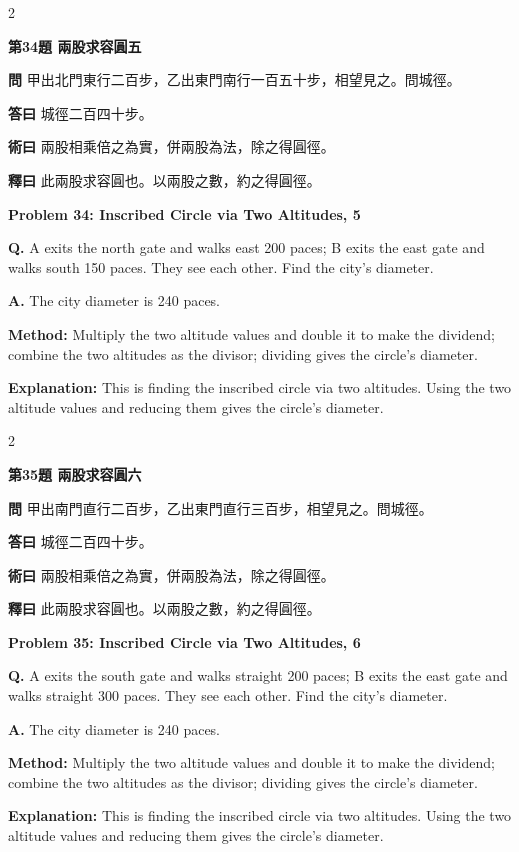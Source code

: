 \documentclass[11pt,a4paper]{article}
\newcommand{\wen}[1]{\noindent\textbf{問} #1\par\smallskip}
\newcommand{\da}[1]{\noindent\textbf{答曰} #1\par\smallskip}
\newcommand{\shu}[1]{\noindent\textbf{術曰} #1\par\smallskip}
\newcommand{\shi}[1]{\noindent\textbf{釋曰} #1\par\smallskip}
\newcommand{\wenE}[1]{\noindent\textbf{Q.} #1\par\smallskip}
\newcommand{\daE}[1]{\noindent\textbf{A.} #1\par\smallskip}
\newcommand{\shuE}[1]{\noindent\textbf{Method:} #1\par\smallskip}
\newcommand{\shiE}[1]{\noindent\textbf{Explanation:} #1\par\smallskip}
\begin{document}
\begin{paracol}{2}

\noindent\textbf{第34題 兩股求容圓五}

\wen{甲出北門東行二百步，乙出東門南行一百五十步，相望見之。問城徑。}
\da{城徑二百四十步。}
\shu{兩股相乘倍之為實，併兩股為法，除之得圓徑。}
\shi{此兩股求容圓也。以兩股之數，約之得圓徑。}

\switchcolumn

\noindent\textbf{Problem 34: Inscribed Circle via Two Altitudes, 5}

\wenE{A exits the north gate and walks east 200 paces; B exits the east gate and walks south 150 paces. They see each other. Find the city's diameter.}
\daE{The city diameter is 240 paces.}
\shuE{Multiply the two altitude values and double it to make the dividend; combine the two altitudes as the divisor; dividing gives the circle's diameter.}
\shiE{This is finding the inscribed circle via two altitudes. Using the two altitude values and reducing them gives the circle's diameter.}

\end{paracol}

\bigskip

\begin{paracol}{2}

\noindent\textbf{第35題 兩股求容圓六}

\wen{甲出南門直行二百步，乙出東門直行三百步，相望見之。問城徑。}
\da{城徑二百四十步。}
\shu{兩股相乘倍之為實，併兩股為法，除之得圓徑。}
\shi{此兩股求容圓也。以兩股之數，約之得圓徑。}

\switchcolumn

\noindent\textbf{Problem 35: Inscribed Circle via Two Altitudes, 6}

\wenE{A exits the south gate and walks straight 200 paces; B exits the east gate and walks straight 300 paces. They see each other. Find the city's diameter.}
\daE{The city diameter is 240 paces.}
\shuE{Multiply the two altitude values and double it to make the dividend; combine the two altitudes as the divisor; dividing gives the circle's diameter.}
\shiE{This is finding the inscribed circle via two altitudes. Using the two altitude values and reducing them gives the circle's diameter.}

\end{paracol}

\bigskip
\end{document}
